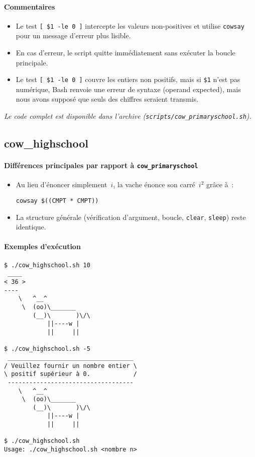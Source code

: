 \documentclass[a4paper,french,11pt]{article}
\begin{document}
\paragraph{Commentaires}  
\begin{itemize}
  \item Le test \texttt{[ \$1 -le 0 ]} intercepte les valeurs non-positives et utilise \texttt{cowsay} pour un message d’erreur plus lisible.  
  \item En cas d’erreur, le script quitte immédiatement sans exécuter la boucle principale.  
  \item Le test \texttt{[ \$1 -le 0 ]} couvre les entiers non positifs, mais si \texttt{\$1} n’est pas numérique, Bash renvoie une erreur de syntaxe (operand expected), mais nous avons supposé que seuls des chiffres seraient transmis.
\end{itemize}

\medskip
\noindent\emph{Le code complet est disponible dans l’archive (\texttt{scripts/cow\_primaryschool.sh}).}

\newpage

\subsection{cow\_highschool}

\paragraph{Différences principales par rapport à \texttt{cow\_primaryschool}}  
\begin{itemize}
  \item Au lieu d’énoncer simplement $i$, la vache énonce son carré $i^2$ grâce à :
    \begin{verbatim}
cowsay $((CMPT * CMPT))
    \end{verbatim}
  \item La structure générale (vérification d’argument, boucle, \texttt{clear}, \texttt{sleep}) reste identique.
\end{itemize}

\paragraph{Exemples d’exécution}
\begin{verbatim}
$ ./cow_highschool.sh 10
 ____
< 36 >
----
    \   ^__^
     \  (oo)\_______
        (__)\       )\/\
            ||----w |
            ||     ||

$ ./cow_highschool.sh -5
 ___________________________________
/ Veuillez fournir un nombre entier \
\ positif supérieur à 0.            /
 -----------------------------------
    \   ^__^
     \  (oo)\_______
        (__)\       )\/\
            ||----w |
            ||     ||

$ ./cow_highschool.sh
Usage: ./cow_highschool.sh <nombre n>
\end{verbatim}
\end{document}
